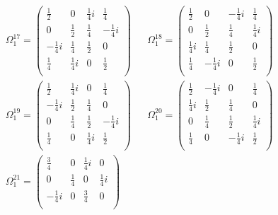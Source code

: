 \newpage
\begin{align*}
    \Omega_{1}^{17} = 
    \begin{pmatrix}
    \frac{1}{2}  &  0  &  \frac{1}{4}i  &  \frac{1}{4}  \\
    0  &  \frac{1}{2}  &  \frac{1}{4}  &  -\frac{1}{4}i  \\
    -\frac{1}{4}i  &  \frac{1}{4}  &  \frac{1}{2}  &  0  \\
    \frac{1}{4}  &  \frac{1}{4}i  &  0  &  \frac{1}{2}  \\
    \end{pmatrix}
    &&
    \Omega_{1}^{18} = 
    \begin{pmatrix}
    \frac{1}{2}  &  0  &  -\frac{1}{4}i  &  \frac{1}{4}  \\
    0  &  \frac{1}{2}  &  \frac{1}{4}  &  \frac{1}{4}i  \\
    \frac{1}{4}i  &  \frac{1}{4}  &  \frac{1}{2}  &  0  \\
    \frac{1}{4}  &  -\frac{1}{4}i  &  0  &  \frac{1}{2}  \\
    \end{pmatrix}
    \\
    \Omega_{1}^{19} = 
    \begin{pmatrix}
    \frac{1}{2}  &  \frac{1}{4}i  &  0  &  \frac{1}{4}  \\
    -\frac{1}{4}i  &  \frac{1}{2}  &  \frac{1}{4}  &  0  \\
    0  &  \frac{1}{4}  &  \frac{1}{2}  &  -\frac{1}{4}i  \\
    \frac{1}{4}  &  0  &  \frac{1}{4}i  &  \frac{1}{2}  \\
    \end{pmatrix}
    &&
    \Omega_{1}^{20} = 
    \begin{pmatrix}
    \frac{1}{2}  &  -\frac{1}{4}i  &  0  &  \frac{1}{4}  \\
    \frac{1}{4}i  &  \frac{1}{2}  &  \frac{1}{4}  &  0  \\
    0  &  \frac{1}{4}  &  \frac{1}{2}  &  \frac{1}{4}i  \\
    \frac{1}{4}  &  0  &  -\frac{1}{4}i  &  \frac{1}{2}  \\
    \end{pmatrix}
    \\
    \Omega_{1}^{21} = 
    \begin{pmatrix}
    \frac{3}{4}  &  0  &  \frac{1}{4}i  &  0  \\
    0  &  \frac{1}{4}  &  0  &  \frac{1}{4}i  \\
    -\frac{1}{4}i  &  0  &  \frac{3}{4}  &  0  \\

\end{pmatrix}
\end{align*}
